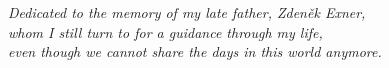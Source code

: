 \documentclass[bibliography=totocnumbered,dvipsnames,FM,Dis,EN]{tulthesis}
\begin{document}


\clearpage


\thispagestyle{empty}
\vspace*{2in}
\begin{center}
\emph{
Dedicated to the memory of my late father, Zden{\v e}k Exner,\\
whom I still turn to for a guidance through my life,\\
even though we cannot share the days in this world anymore.
}
\end{center}
\vspace*{\fill}
\clearpage
\end{document}

